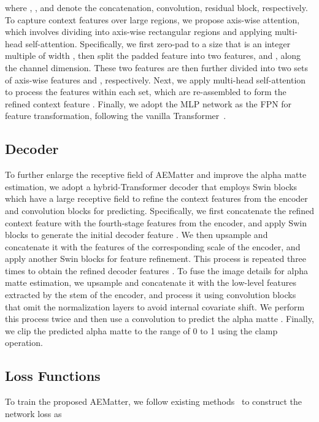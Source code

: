 \documentclass[10pt,twocolumn,letterpaper]{article}
\begin{document}
where , , and  denote the concatenation,  convolution, residual block, respectively.
To capture context features over large regions, we propose axis-wise attention, which involves dividing  into axis-wise rectangular regions and applying multi-head self-attention.
Specifically, we first zero-pad  to a size that is an integer multiple of width , then split the padded feature  into two features,  and , along the channel dimension. 
These two features are then further divided into two sets of axis-wise features  and , respectively. 
Next, we apply multi-head self-attention to process the features within each set, which are re-assembled to form the refined context feature .
Finally, we adopt the MLP network as the FPN for feature transformation, following the vanilla Transformer~\cite{vaswani2017attention}. 
 
\subsection{Decoder}
To further enlarge the receptive field of AEMatter and improve the alpha matte estimation, we adopt a hybrid-Transformer decoder that employs Swin blocks which have a large receptive field to refine the context features from the encoder and convolution blocks for predicting. 
Specifically, we first concatenate the refined context feature  with the fourth-stage features  from the encoder, and apply Swin blocks  to generate the initial decoder feature . 
We then upsample  and concatenate it with the features of the corresponding scale of the encoder, and apply another Swin blocks  for feature refinement. 
This process is repeated three times to obtain the refined decoder features .
To fuse the image details for alpha matte estimation, we upsample  and concatenate it with the low-level features extracted by the stem of the encoder, and process it using convolution blocks that omit the normalization layers to avoid internal covariate shift. 
We perform this process twice and then use a  convolution to predict the alpha matte . 
Finally, we clip the predicted alpha matte  to the range of 0 to 1 using the clamp operation.



\subsection{Loss Functions}
To train the proposed AEMatter, we follow existing methods~\cite{xu2017deep,forte2020fbamatting} to construct the network loss  as 
\end{document}

